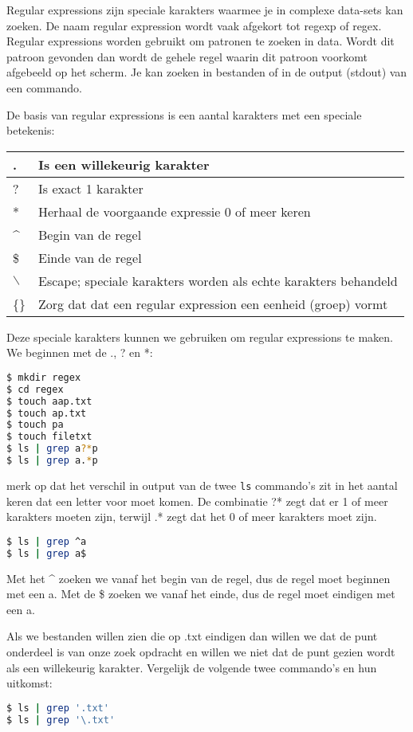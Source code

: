 Regular expressions zijn speciale karakters waarmee je in complexe data-sets kan zoeken. De naam regular expression wordt vaak afgekort tot regexp of regex. Regular expressions worden gebruikt om patronen te zoeken in data. Wordt dit patroon gevonden dan wordt de gehele regel waarin dit patroon voorkomt afgebeeld op het scherm. Je kan zoeken in bestanden of in de output (stdout) van een commando.

De basis van regular expressions is een aantal karakters met een speciale betekenis:

\begin{tabular}{| l | l |}
\hline
. & Is een willekeurig karakter \\
\hline
? & Is exact 1 karakter \\
\hline
* & Herhaal de voorgaande expressie 0 of meer keren \\
\hline
\textasciicircum & Begin van de regel \\
\hline
\$ & Einde van de regel \\
\hline
$\backslash$ & Escape; speciale karakters worden als echte karakters behandeld \\
\hline
\{\} & Zorg dat dat een regular expression een eenheid (groep) vormt \\
\hline
\end{tabular}

Deze speciale karakters kunnen we gebruiken om regular expressions te maken. We beginnen met de ., ? en *:
\begin{lstlisting}[language=bash]
$ mkdir regex
$ cd regex
$ touch aap.txt
$ touch ap.txt
$ touch pa
$ touch filetxt
$ ls | grep a?*p
$ ls | grep a.*p
\end{lstlisting}
merk op dat het verschil in output van de twee \texttt{ls} commando's zit in het aantal keren dat een letter voor moet komen. De combinatie ?* zegt dat er 1 of meer karakters moeten zijn, terwijl .* zegt dat het 0 of meer karakters moet zijn.

\begin{lstlisting}[language=bash]
$ ls | grep ^a
$ ls | grep a$
\end{lstlisting}
Met het \textasciicircum{} zoeken we vanaf het begin van de regel, dus de regel moet beginnen met een a. Met de \$ zoeken we vanaf het einde, dus de regel moet eindigen met een a.

Als we bestanden willen zien die op .txt eindigen dan willen we dat de punt onderdeel is van onze zoek opdracht en willen we niet dat de punt gezien wordt als een willekeurig karakter. Vergelijk de volgende twee commando's en hun uitkomst:
\begin{lstlisting}[language=bash]
$ ls | grep '.txt'
$ ls | grep '\.txt'
\end{lstlisting}

